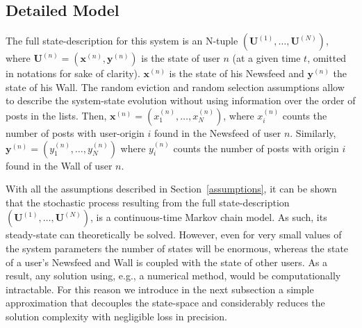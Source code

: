 \documentclass[10pt, conference, letterpaper]{IEEEtran}
\newcommand{\blue}[1]{\textcolor{blue}{#1}}
\begin{document}
\subsection{Detailed Model}
\label{State}
The full state-description for this system is an N-tuple $(\mathbf{U}^{(1)},\ldots,\mathbf{U}^{(N)})$, where $\mathbf{U}^{(n)}=(\mathbf{x}^{(n)},\mathbf{y}^{(n)})$ is the state of user $n$ (at a given time $t$, omitted in notations for sake of clarity). $\mathbf{x}^{(n)}$ is the state of his Newsfeed and $\mathbf{y}^{(n)}$ the state of his Wall.
The random eviction and random selection assumptions allow to describe the system-state evolution without using information over the order of posts in the lists. Then, $\mathbf{x}^{(n)}=(x_1^{(n)},\ldots,x_N^{(n)})$, where $x^{(n)}_i$ counts the number of posts with user-origin $i$ found in the Newsfeed of user $n$.
Similarly,  $\mathbf{y}^{(n)}=(y_1^{(n)},\ldots,y_N^{(n)})$ where $y^{(n)}_i$ counts the number of posts with origin $i$ found in the Wall of user $n$.

With all the assumptions described in Section~\ref{assumptions}, it can be shown that the stochastic process resulting from the full state-description $(\mathbf{U}^{(1)},\ldots,\mathbf{U}^{(N)})$, is a continuous-time Markov chain model. As such, its steady-state can theoretically be solved. However, even for very small values of the system parameters the number of states will be enormous, whereas the state of a user's Newsfeed and Wall is coupled with the state of other users. As a result, any solution using, e.g., a numerical method, would be computationally intractable. For this reason we introduce in the next subsection a simple approximation that decouples the state-space and considerably reduces the solution complexity with negligible loss in precision.

\end{document}
